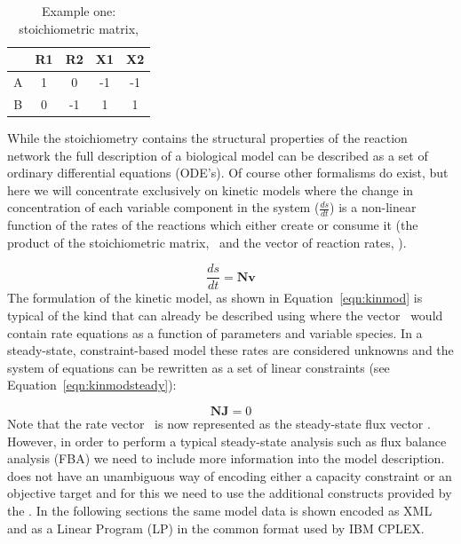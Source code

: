 \begin{table}[h]
  \centering
    \begin{tabular}{c|cccc}
          & R1 & R2 & X1 & X2 \\ \hline
        A & 1 &  0 & -1 & -1 \\
        B & 0 & -1 &  1 &  1 \\
    \end{tabular}
  \caption{Example one: stoichiometric matrix, \Nmat}
  \label{tble:ex1nmat}
\end{table}
%
While the stoichiometry contains the structural properties of the
reaction network the full description of a biological model can be
described as a set of ordinary differential equations (ODE's). Of course
other formalisms do exist, but here we will concentrate exclusively on
kinetic models where the change in concentration of each variable
component in the system ($\frac{ds}{dt}$) is a non-linear function of
the rates of the reactions which either create or consume it (the
product of the stoichiometric matrix, \Nmat\ and the vector of reaction
rates, \vvec).


%
\begin{equation}\label{eqn:kinmod}
  \frac{ds}{dt} = \textbf{Nv}
\end{equation}
%
The formulation of the kinetic model, as shown in
Equation~\ref{eqn:kinmod} is typical of the kind that can already be
described using \sbmlthreecore where the vector \vvec\ would contain
rate equations as a function of parameters and variable species. In a
steady-state, constraint-based model these rates are considered unknowns
and the system of equations can be rewritten as a set of linear
constraints (see Equation~\ref{eqn:kinmodsteady}):


%
\begin{equation}\label{eqn:kinmodsteady}
  \textbf{NJ} = 0
\end{equation}
%
Note that the rate vector \vvec\ is now represented as the steady-state
flux vector \Jvec. However, in order to perform a typical steady-state
analysis such as flux balance analysis (FBA) we need to include more
information into the model description. \sbmlthreecore does not have an
unambiguous way of encoding either a capacity constraint or an objective
target and for this we need to use the additional constructs provided by
the \FBCPackage. In the following sections the same model data is shown
encoded as XML and as a Linear Program (LP) in the common format used by
IBM \textsf{CPLEX}.


